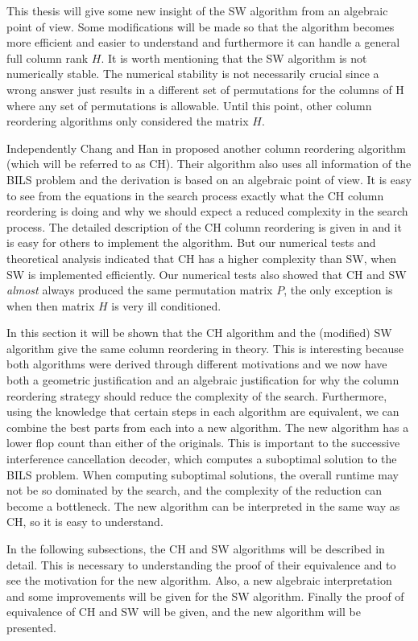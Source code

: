 \documentclass[12pt,Bold,letterpaper]{mcgilletdclass}
\begin{document}
This thesis will give some new insight of the SW algorithm from an algebraic point of view.
Some modifications will be made so that the algorithm becomes more efficient
and easier to understand and furthermore it can handle a general full column rank $H$.
It is worth mentioning that the SW algorithm is not numerically stable. The numerical stability is not
necessarily crucial since a wrong answer just results in a different set of
permutations for the columns of H where any set of permutations is allowable.
Until this point, other column reordering algorithms only considered the matrix $H$.

Independently  Chang and Han in \cite{ChaH05} proposed
another column reordering algorithm (which will be referred to as  CH).
Their algorithm also uses all information of the BILS problem and the derivation
is based on an algebraic point of view. It is  easy to see from the equations in
the search process exactly what the CH column reordering is doing and why we
should expect a reduced complexity in the search process. The detailed
description of the CH column reordering is given in \cite{ChaH05} and it is easy
for others to implement the algorithm.
But our numerical tests and theoretical analysis indicated that CH has a higher complexity than SW, when SW
is implemented efficiently.
Our numerical tests also showed that CH and SW {\em almost} always   
produced the same permutation matrix $P$, the only exception is when then matrix $H$ is very ill conditioned.

In this section it will be shown that the CH algorithm and the  (modified)  SW algorithm give the same
column reordering in theory. This is interesting because both algorithms were derived through different motivations
and we now have both a geometric justification and an algebraic justification 
for why the column reordering strategy should reduce the complexity of the search.
Furthermore, using the knowledge that certain steps in each algorithm are equivalent,
we can combine the best parts from each into a new algorithm. The new algorithm
has a lower flop count than either of the originals.
This is important to the successive interference cancellation decoder, 
which computes a suboptimal solution to the BILS problem. When computing suboptimal solutions, the overall runtime may not be so dominated by the search, and the complexity of the reduction can become a bottleneck.
The new algorithm can be interpreted in the same way as CH,
so it is easy to understand. 

In the following subsections, the CH and SW algorithms will be described in detail. This is necessary to understanding the proof of their equivalence and to see the motivation for the new algorithm. Also, a new algebraic interpretation and some improvements will be given for the SW algorithm. Finally the proof of equivalence of CH and SW will be given, and the new algorithm will be presented.
\end{document}
